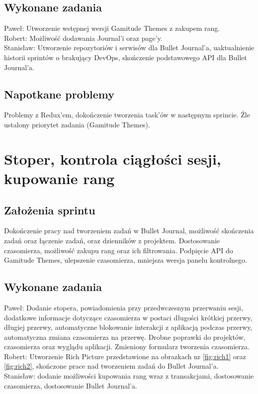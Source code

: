 \documentclass[a4paper,11pt]{report}
\begin{document}
\subsection {Wykonane zadania}
Paweł: Utworzenie wstępnej wersji Gamitude Themes z zakupem rang.\\
Robert: Możliwość dodawania Journal'i oraz page'y.\\
Stanisław: Utworzenie repozytoriów i serwisów dla Bullet Journal'a, uaktualnienie historii sprintów o brakujący DevOps, skończenie podstawowego API dla Bullet Journal'a.\\
\subsection {Napotkane problemy}
Problemy z Redux'em, dokończenie tworzenia task'ów w następnym sprincie. Źle ustalony priorytet zadania (Gamitude Themes).

\section {Stoper, kontrola ciągłości sesji, kupowanie rang}
\subsection {Założenia sprintu}
Dokończenie pracy nad tworzeniem zadań w Bullet Journal, możliwość skończenia zadań oraz łączenie zadań, oraz dzienników z projektem. Dostosowanie czasomierza, możliwość zakupu rang oraz ich filtrowania. Podpięcie API do Gamitude Themes, ulepszenie czasomierza, mniejsza wersja panelu kontrolnego.
\subsection {Wykonane zadania}
Paweł: Dodanie stopera, powiadomienia przy przedwczesnym przerwaniu sesji, dodatkowe informacje dotyczące czasomierza w postaci długości krótkiej przerwy, długiej przerwy, automatyczne blokowanie interakcji z aplikacją podczas przerwy, automatyczna zmiana czasomierza na przerwę. Drobne poprawki do projektów, czasomierza oraz wyglądu aplikacji. Zmieniony formularz tworzenia czasomierza.\\
Robert: Utworzenie Rich Picture przedstawione na obrazkach nr \ref{fig:rich1} oraz \ref{fig:rich2}, skończone prace nad tworzeniem zadań do Bullet Journal'a.\\
Stanisław: dodanie możliwości kupowania rang wraz z transakcjami, dostosowanie czasomierza, dostosowanie Bullet Journal'a.\\
\end{document}
